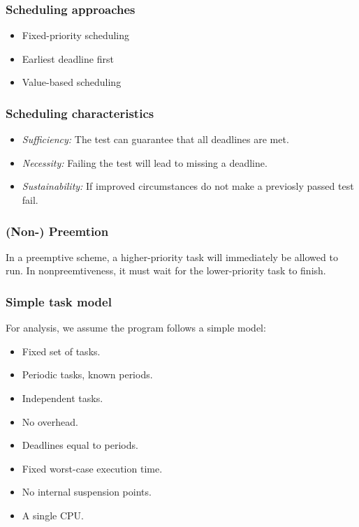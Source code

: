 \documentclass[a4paper, 12pt]{article}
\begin{document}
\subsubsection{Scheduling approaches}
\begin{itemize}
	\item Fixed-priority scheduling
	\item Earliest deadline first
	\item Value-based scheduling
\end{itemize}

\subsubsection{Scheduling characteristics}
\begin{itemize}
	\item \emph{Sufficiency:} The test can guarantee that all deadlines are met.
	\item \emph{Necessity:} Failing the test will lead to missing a deadline.
	\item \emph{Sustainability:} If improved circumstances do not make a previosly passed test fail.
\end{itemize}

\subsubsection{(Non-) Preemtion}
In a preemptive scheme, a higher-priority task will immediately be allowed to run. In nonpreemtiveness, it must wait for the lower-priority task to finish.

\subsubsection{Simple task model}
For analysis, we assume the program follows a simple model:
\begin{itemize}
	\item Fixed set of tasks.
	\item Periodic tasks, known periods.
	\item Independent tasks.
	\item No overhead.
	\item Deadlines equal to periods.
	\item Fixed worst-case execution time.
	\item No internal suspension points.
	\item A single CPU.
\end{itemize}
\end{document}
